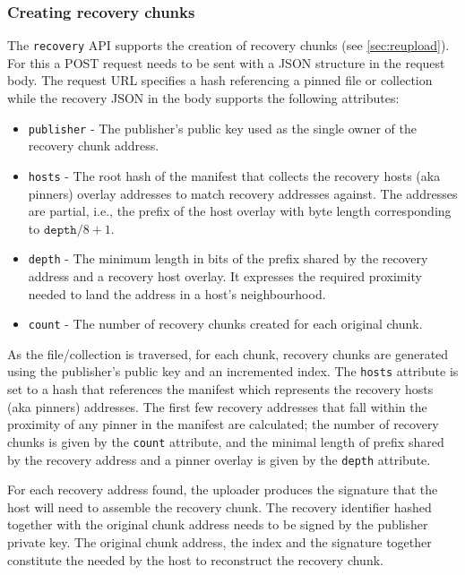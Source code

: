\subsubsection{Creating recovery chunks}


The \texttt{recovery} API supports the creation of recovery chunks (see \ref{sec:reupload}). For this a POST request needs to be sent with a JSON structure in the request body. The request URL specifies a hash referencing a pinned file or collection while the recovery JSON in the body supports the following attributes:

\begin{itemize}
\item \texttt{publisher} - The publisher's public key used as the single  owner of the recovery chunk address.
\item \texttt{hosts} - The root hash of the manifest that collects the recovery hosts (aka pinners) overlay addresses to match recovery addresses against. The addresses are partial, i.e., the prefix of the host overlay with byte length corresponding to $\mathtt{depth} / 8+1$.  
\item \texttt{depth} - The minimum length in bits of the prefix shared by the recovery address and a recovery host overlay. It expresses the required proximity needed to land the address in a host's neighbourhood. 
\item \texttt{count} - The number of recovery chunks created for each original chunk. 
\end{itemize}

As the file/collection is traversed, for each chunk, recovery chunks are generated using the publisher's public key and an incremented index. The \texttt{hosts} attribute is set to a hash that references the manifest which represents the recovery hosts (aka pinners) addresses. The first few recovery addresses that fall within the proximity of any pinner in the manifest are calculated; the number of recovery chunks is given by the \texttt{count} attribute, and the minimal length of prefix shared by the recovery address and a pinner overlay is given by the \texttt{depth} attribute.

For each recovery address found, the uploader produces the signature that the host will need to assemble the recovery chunk. The recovery identifier hashed together with the original chunk  address needs to be signed by the publisher private key. The original chunk address, the index and the signature together constitute the  needed by the host to reconstruct the recovery chunk. 

